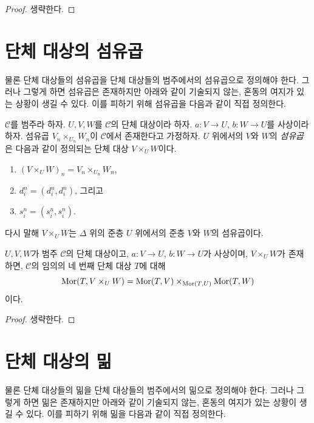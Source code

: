 \begin{proof}
생략한다.
\end{proof}


\section{단체 대상의 섬유곱}
\label{section-fibre-products}

\noindent
물론 단체 대상들의 섬유곱을 단체 대상들의 범주에서의 섬유곱으로
정의해야 한다. 그러나 그렇게 하면 섬유곱은 존재하지만 아래와 같이
기술되지 않는, 혼동의 여지가 있는 상황이 생길 수 있다.
이를 피하기 위해 섬유곱을 다음과 같이 직접 정의한다.

\begin{definition}
\label{definition-fibre-product}
$\mathcal{C}$를 범주라 하자.
$U, V, W$를 $\mathcal{C}$의 단체 대상이라 하자.
$a : V \to U$, $b : W \to U$를 사상이라 하자.
섬유곱 $V_n \times_{U_n} W_n$이 $\mathcal{C}$에서 존재한다고 가정하자.
{$U$ 위에서의 $V$와 $W$의 {\it 섬유곱}}은 다음과 같이 정의되는
단체 대상 $V \times_U W$이다.
\begin{enumerate}
\item $(V \times_U W)_n = V_n \times_{U_n} W_n$,
\item $d^n_i = (d^n_i, d^n_i)$, 그리고
\item $s^n_i = (s^n_i, s^n_i)$.
\end{enumerate}
다시 말해 $V \times_U W$는 $\Delta$ 위의 준층 $U$ 위에서의
준층 $V$와 $W$의 섬유곱이다.
\end{definition}

\begin{lemma}
\label{lemma-fibre-product}
$U, V, W$가 범주 $\mathcal{C}$의 단체 대상이고,
$a : V \to U$, $b : W \to U$가 사상이며,
$V \times_U W$가 존재하면, $\mathcal{C}$의 임의의 네 번째 단체 대상
$T$에 대해
$$
\mathop{\mathrm{Mor}}\nolimits(T, V \times_U W) =
\mathop{\mathrm{Mor}}\nolimits(T, V) \times_{\mathop{\mathrm{Mor}}\nolimits(T, U)}
\mathop{\mathrm{Mor}}\nolimits(T, W)
$$
이다.
\end{lemma}

\begin{proof}
생략한다.
\end{proof}

\section{단체 대상의 밂}
\label{section-push-outs}

\noindent
물론 단체 대상들의 밂을 단체 대상들의 범주에서의 밂으로 정의해야 한다.
그러나 그렇게 하면 밂은 존재하지만 아래와 같이 기술되지 않는,
혼동의 여지가 있는 상황이 생길 수 있다. 이를 피하기 위해 밂을
다음과 같이 직접 정의한다.

